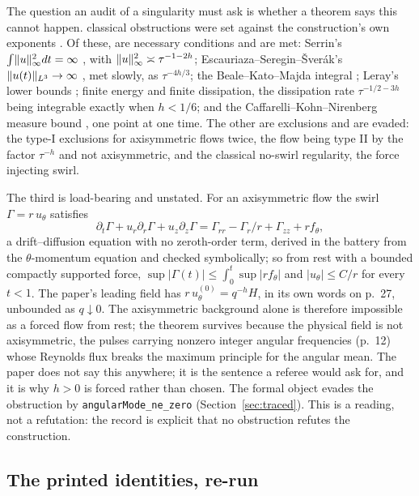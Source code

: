 \documentclass[11pt]{article}
\newcommand{\lean}[1]{\texttt{#1}}
\newcommand{\Lp}[1]{L^{#1}}
\begin{document}
The question an audit of a singularity must ask is whether a theorem says this cannot
happen. \ObstructionRows{} classical obstructions were set against the construction's own
exponents \cite{Records}. Of these,
\ObstructionsMet{} are necessary conditions and are met: Serrin's
$\int\lVert u \rVert_\infty^2dt=\infty$ \cite{Serrin}, with $\lVert u \rVert_\infty^2\asymp\tau^{-1-2h}$;
Escauriaza--Seregin--\v{S}ver\'ak's $\norm{u(t)}_{\Lp3}\to\infty$ \cite{ESS}, met slowly, as
$\tau^{-4h/3}$; the Beale--Kato--Majda integral \cite{BKM}; Leray's lower bounds
\cite{Leray}; finite energy and finite dissipation, the dissipation rate $\tau^{-1/2-3h}$
being integrable exactly when $h<1/6$; and the Caffarelli--Kohn--Nirenberg measure bound
\cite{CKN}, one point at one time. The other \ObstructionsEvaded{} are exclusions and are
evaded: the type-I exclusions for axisymmetric flows \cite{CSYT,KNSS} twice, the flow being
type II by the factor $\tau^{-h}$ and not axisymmetric, and the classical no-swirl
regularity, the force injecting swirl.

The third is load-bearing and unstated. For an axisymmetric flow the swirl $\Gamma=r\,u_\theta$
satisfies
\[
\partial_t\Gamma+u_r\partial_r\Gamma+u_z\partial_z\Gamma
=\Gamma_{rr}-\Gamma_r/r+\Gamma_{zz}+r f_\theta ,
\]
a drift--diffusion equation with no zeroth-order term, derived in the battery from the
$\theta$-momentum equation and checked symbolically; so from rest with a bounded compactly
supported force, $\sup|\Gamma(t)|\le\int_0^t\sup|rf_\theta|$ and $|u_\theta|\le C/r$ for every
$t<1$. The paper's leading field has $r\,u_\theta^{(0)}=q^{-h}H$, in its own words on p.~27,
unbounded as $q\downarrow0$. The axisymmetric background alone is therefore impossible as a
forced flow from rest; the theorem survives because the physical field is not axisymmetric,
the pulses carrying nonzero integer angular frequencies (p.~12) whose Reynolds flux breaks
the maximum principle for the angular mean. The paper does not say this anywhere; it is the
sentence a referee would ask for, and it is why $h>0$ is forced rather than chosen. The
formal object evades the obstruction by \lean{angularMode\_ne\_zero}
(Section~\ref{sec:traced}). This is a reading, not a refutation: the record is explicit that
no obstruction refutes the construction.

\subsection{The printed identities, re-run}\label{sec:probes}
\end{document}
